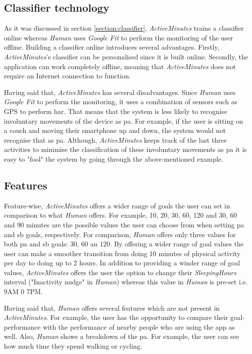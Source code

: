 \subsection{Classifier technology}
As it was discussed in section \ref{section:classifier}, \textit{ActiveMinutes} trains a classifier online whereas \textit{Human} uses \textit{Google Fit} to perform the monitoring of the user offline. Building a classifier online introduces several advantages. Firstly, \textit{ActiveMinutes}'s classifier can be personalised since it is built online. Secondly, the application can work completely offline, meaning that \textit{ActiveMinutes} does not require an Internet connection to function. 

Having said that, \textit{ActiveMinutes} has several disadvantages. Since \textit{Human} uses \textit{Google Fit} to perform the monitoring, it uses a combination of sensors such as GPS to perform \gls{har}. That means that the system is less likely to recognise involuntary movements of the device as \gls{pa}. For example, if the user is sitting on a couch and moving their smartphone up and down, the system would not recognise that as \gls{pa}. Although, \textit{ActiveMinutes} keeps track of the last three activities to minimise the classification of these involuntary movements as \gls{pa} it is easy to "fool" the system by going through the above-mentioned example.

\subsection{Features}
Feature-wise, \textit{ActiveMinutes} offers a wider range of goals the user can set in comparison to what \textit{Human} offers. For example, 10, 20, 30, 60, 120 and 30, 60 and 90 minutes are the possible values the user can choose from when setting \gls{pa} and \gls{sb} goals, respectively. For comparison, \textit{Human} offers only three values for both \gls{pa} and \gls{sb} goals: 30, 60 an 120. By offering a wider range of goal values the user can make a smoother transition from doing 10 minutes of physical activity per day to doing up to 2 hours. In addition to providing a winder range of goal values, \textit{ActiveMinutes} offers the user the option to change their \textit{SleepingHours} interval ("Inactivity nudge" in \textit{Human}) whereas this value in \textit{Human} is pre-set i.e. 9AM 0 7PM.

Having said that, \textit{Human} offers several features which are not present in \textit{ActiveMinutes}. For example, the user has the opportunity to compare their goal-performance with the performance of nearby people who are using the app as well. Also, \textit{Human} shows a breakdown of the \gls{pa}. For example, the user can see how much time they spend walking or cycling. 

